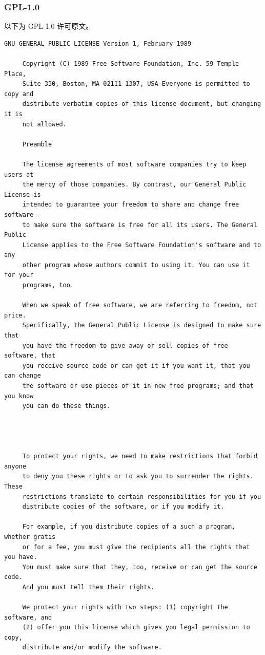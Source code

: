 \subsubsection*{GPL-1.0}

以下为 GPL-1.0 许可原文。

\begin{lstlisting}[basicstyle=\ttfamily\footnotesize,breaklines=true]
     GNU GENERAL PUBLIC LICENSE Version 1, February 1989

     Copyright (C) 1989 Free Software Foundation, Inc. 59 Temple Place,
     Suite 330, Boston, MA 02111-1307, USA Everyone is permitted to copy and
     distribute verbatim copies of this license document, but changing it is
     not allowed.

     Preamble

     The license agreements of most software companies try to keep users at
     the mercy of those companies. By contrast, our General Public License is
     intended to guarantee your freedom to share and change free software--
     to make sure the software is free for all its users. The General Public
     License applies to the Free Software Foundation's software and to any
     other program whose authors commit to using it. You can use it for your
     programs, too.

     When we speak of free software, we are referring to freedom, not price.
     Specifically, the General Public License is designed to make sure that
     you have the freedom to give away or sell copies of free software, that
     you receive source code or can get it if you want it, that you can change
     the software or use pieces of it in new free programs; and that you know
     you can do these things.




     To protect your rights, we need to make restrictions that forbid anyone
     to deny you these rights or to ask you to surrender the rights. These
     restrictions translate to certain responsibilities for you if you
     distribute copies of the software, or if you modify it.

     For example, if you distribute copies of a such a program, whether gratis
     or for a fee, you must give the recipients all the rights that you have.
     You must make sure that they, too, receive or can get the source code.
     And you must tell them their rights.

     We protect your rights with two steps: (1) copyright the software, and
     (2) offer you this license which gives you legal permission to copy,
     distribute and/or modify the software.


\end{lstlisting}

